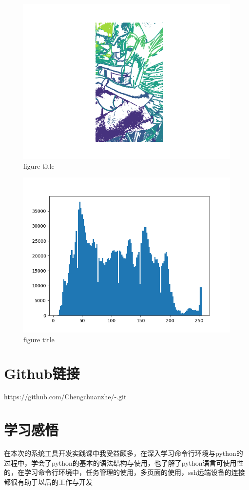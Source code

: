 \documentclass[a4paper, 12pt]{article}
\begin{document}
\begin{enumerate}
\begin{lstlisting}
    \end{lstlisting}
 \begin{figure}[htbp]
        \centering
        \includegraphics[scale=0.5]{Figure_2.png}
        \caption{figure title}
        \label{figure}
 \end{figure}   
 \begin{figure}[htbp]
        \centering
        \includegraphics[scale=0.5]{Figure_3.png}
        \caption{figure title}
        \label{figure}
 \end{figure}
\end{enumerate}
\section{Github链接}
https://github.com/Chengchuanzhe/-.git
\section{学习感悟}
    在本次的系统工具开发实践课中我受益颇多，在深入学习命令行环境与python的过程中，学会了python的基本的语法结构与使用，也了解了python语言可使用性的，在学习命令行环境中，任务管理的使用，多页面的使用，ssh远端设备的连接都很有助于以后的工作与开发
\end{document}
